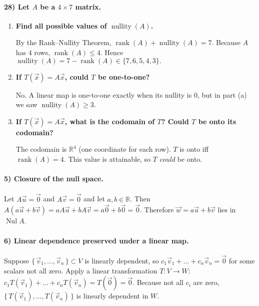 \documentclass{article}
\begin{document}
\begin{multicols*}{2}
\paragraph{28) Let $A$ be a $4\times 7$ matrix.}

\begin{enumerate}[label=(\alph*)]
\item \textbf{Find all possible values of $\operatorname{nullity}(A)$.}

By the Rank–Nullity Theorem,
$
\operatorname{rank}(A)+\operatorname{nullity}(A)=7.
$
Because $A$ has $4$ rows, $\operatorname{rank}(A)\le 4$.  
Hence
$
\operatorname{nullity}(A)=7-\operatorname{rank}(A)\in\{7,6,5,4,3\}.
$

\item \textbf{If $T(\vec x)=A\vec x$, could $T$ be one-to-one?}

No. A linear map is one-to-one exactly when its nullity is $0$, but in part (a) we saw $\operatorname{nullity}(A)\ge 3$.

\item \textbf{If $T(\vec x)=A\vec x$, what is the codomain of $T$? Could $T$ be onto its codomain?}

The codomain is $\mathbb R^{4}$ (one coordinate for each row).  
$T$ is onto iff $\operatorname{rank}(A)=4$. This value is attainable, so $T$ \emph{could} be onto.

\end{enumerate}

\paragraph{5) Closure of the null space.}

Let $A\vec u=\vec 0$ and $A\vec v=\vec 0$ and let $a,b\in\mathbb R$.  
Then
$
A(a\vec u+b\vec v)=aA\vec u+bA\vec v=a\vec 0+b\vec 0=\vec 0.
$
Therefore $\vec w=a\vec u+b\vec v$ lies in $\operatorname{Nul}A$.

\paragraph{6) Linear dependence preserved under a linear map.}

Suppose $\{\,\vec v_{1},\dots,\vec v_{n}\,\}\subset V$ is linearly dependent, so
$
c_{1}\vec v_{1}+\dots+c_{n}\vec v_{n}=\vec 0
$
for some scalars not all zero.  
Apply a linear transformation $T:V\to W$:
$
c_{1}T(\vec v_{1})+\dots+c_{n}T(\vec v_{n})=T(\vec 0)=\vec 0.
$
Because not all $c_{i}$ are zero, $\{\,T(\vec v_{1}),\dots,T(\vec v_{n})\,\}$ is linearly dependent in $W$.


\end{multicols*}
\end{document}
